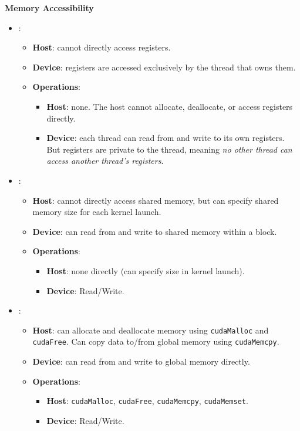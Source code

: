 \newpage

\begin{flushleft}
    \textcolor{Green3}{ \textbf{Memory Accessibility}}
\end{flushleft}
\begin{itemize}
    \item {}:
    \begin{itemize}
        \item \textbf{Host}: cannot directly access registers.
        \item \textbf{Device}: registers are accessed exclusively by the thread that owns them.
        \item \textbf{Operations}:
        \begin{itemize}
            \item \textbf{Host}: none. The host cannot allocate, deallocate, or access registers directly.
            \item \textbf{Device}: each thread can read from and write to its own registers. But registers are private to the thread, meaning \emph{no other thread can access another thread's registers}.
        \end{itemize}
    \end{itemize}

    \item {}:
    \begin{itemize}
        \item \textbf{Host}: cannot directly access shared memory, but can specify shared memory size for each kernel launch.
        \item \textbf{Device}: can read from and write to shared memory within a block.
        \item \textbf{Operations}:
        \begin{itemize}
            \item \textbf{Host}: none directly (can specify size in kernel launch).
            \item \textbf{Device}: Read/Write.
        \end{itemize}
    \end{itemize}

    \item {}:
    \begin{itemize}
        \item \textbf{Host}: can allocate and deallocate memory using \texttt{cudaMalloc} and \texttt{cudaFree}. Can copy data to/from global memory using \texttt{cudaMemcpy}.
        \item \textbf{Device}: can read from and write to global memory directly.
        \item \textbf{Operations}:
        \begin{itemize}
            \item \textbf{Host}: \texttt{cudaMalloc}, \texttt{cudaFree}, \texttt{cudaMemcpy}, \texttt{cudaMemset}.
            \item \textbf{Device}: Read/Write.
        \end{itemize}
    \end{itemize}
\end{itemize}

